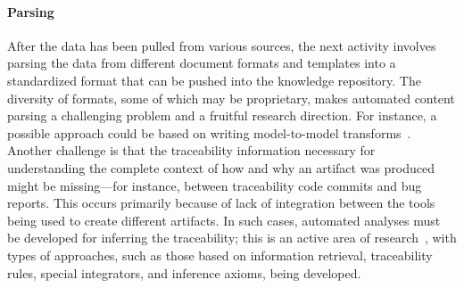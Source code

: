 
\vskip -5pt
\paragraph*{Parsing} After the data has been pulled from various
sources, the next activity involves parsing the data from different document
formats and templates into a standardized format that can be pushed into the
knowledge repository. The diversity of formats, some of which may be
proprietary, makes automated content parsing a challenging problem and a
fruitful research direction. For instance, a possible approach could be based on
writing model-to-model transforms~\cite{debdoot:2010:scc}. Another challenge is
that the traceability information necessary for understanding the complete
context of how and why an artifact was produced might be missing---for instance,
between traceability code commits and bug reports. This occurs primarily because
of lack of integration between the tools being used to create different
artifacts. In such cases, automated analyses must be developed for inferring the
traceability; this is an active area of research~\cite{spanoudakis2005software},
with types of approaches, such as those based on information retrieval,
traceability rules, special integrators, and inference axioms, being developed.


